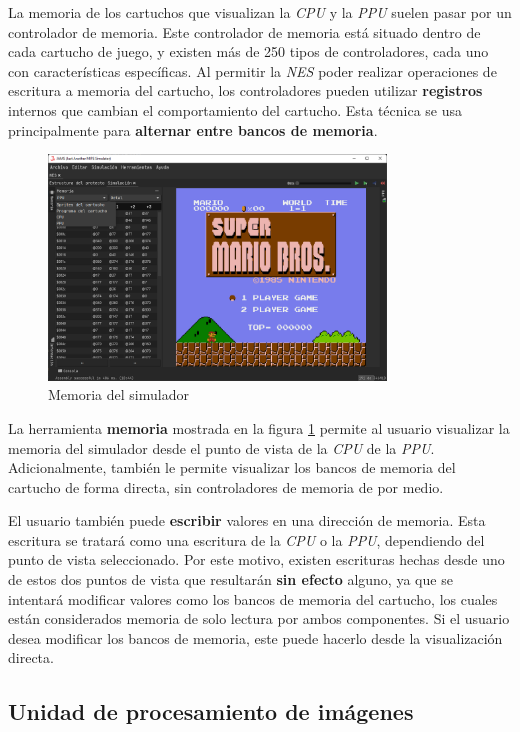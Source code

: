 La memoria de los cartuchos que visualizan la \textit{CPU}
y la \textit{PPU} suelen pasar por un controlador de memoria.
Este controlador de memoria está situado dentro de cada cartucho
de juego, y existen más de 250 tipos de controladores, cada
uno con características específicas.
Al permitir la \textit{NES} poder realizar operaciones de
escritura a memoria del cartucho, los controladores
pueden utilizar \textbf{registros} internos que cambian
el comportamiento del cartucho.
Esta técnica se usa principalmente para \textbf{alternar
entre bancos de memoria}.

\begin{figure}[h]
    \centering
    \includegraphics[width=0.8\textwidth]{images/nes/nes-memory}
    \caption{Memoria del simulador}
    \label{fig:nes-memory}
\end{figure}

La herramienta \textbf{memoria} mostrada en la
figura \ref{fig:nes-memory} permite
al usuario visualizar la memoria del simulador desde
el punto de vista de la \textit{CPU} de la \textit{PPU}.
Adicionalmente, también le permite visualizar los bancos
de memoria del cartucho de forma directa, sin controladores
de memoria de por medio.

El usuario también puede \textbf{escribir} valores en una
dirección de memoria.
Esta escritura se tratará como una escritura de la \textit{CPU}
o la \textit{PPU}, dependiendo del punto de vista seleccionado.
Por este motivo, existen escrituras hechas desde uno de estos
dos puntos de vista que resultarán \textbf{sin efecto} alguno,
ya que se intentará modificar valores como los bancos de memoria
del cartucho, los cuales están considerados memoria de solo
lectura por ambos componentes.
Si el usuario desea modificar los bancos de memoria, este puede
hacerlo desde la visualización directa.

\subsection{Unidad de procesamiento de imágenes}\label{subsec:unidad-de-procesamiento-de-imagenes}

